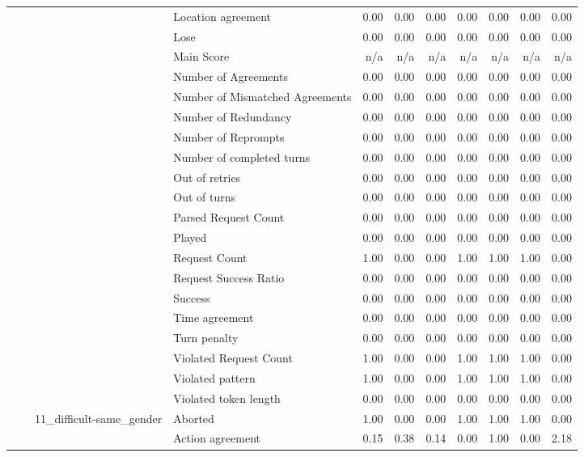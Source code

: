 \begin{tabular}{llllrrrrrrr}
 &  &  & Location agreement & 0.00 & 0.00 & 0.00 & 0.00 & 0.00 & 0.00 & 0.00 \\
 &  &  & Lose & 0.00 & 0.00 & 0.00 & 0.00 & 0.00 & 0.00 & 0.00 \\
 &  &  & Main Score & n/a & n/a & n/a & n/a & n/a & n/a & n/a \\
 &  &  & Number of Agreements & 0.00 & 0.00 & 0.00 & 0.00 & 0.00 & 0.00 & 0.00 \\
 &  &  & Number of Mismatched Agreements & 0.00 & 0.00 & 0.00 & 0.00 & 0.00 & 0.00 & 0.00 \\
 &  &  & Number of Redundancy & 0.00 & 0.00 & 0.00 & 0.00 & 0.00 & 0.00 & 0.00 \\
 &  &  & Number of Reprompts & 0.00 & 0.00 & 0.00 & 0.00 & 0.00 & 0.00 & 0.00 \\
 &  &  & Number of completed turns & 0.00 & 0.00 & 0.00 & 0.00 & 0.00 & 0.00 & 0.00 \\
 &  &  & Out of retries & 0.00 & 0.00 & 0.00 & 0.00 & 0.00 & 0.00 & 0.00 \\
 &  &  & Out of turns & 0.00 & 0.00 & 0.00 & 0.00 & 0.00 & 0.00 & 0.00 \\
 &  &  & Parsed Request Count & 0.00 & 0.00 & 0.00 & 0.00 & 0.00 & 0.00 & 0.00 \\
 &  &  & Played & 0.00 & 0.00 & 0.00 & 0.00 & 0.00 & 0.00 & 0.00 \\
 &  &  & Request Count & 1.00 & 0.00 & 0.00 & 1.00 & 1.00 & 1.00 & 0.00 \\
 &  &  & Request Success Ratio & 0.00 & 0.00 & 0.00 & 0.00 & 0.00 & 0.00 & 0.00 \\
 &  &  & Success & 0.00 & 0.00 & 0.00 & 0.00 & 0.00 & 0.00 & 0.00 \\
 &  &  & Time agreement & 0.00 & 0.00 & 0.00 & 0.00 & 0.00 & 0.00 & 0.00 \\
 &  &  & Turn penalty & 0.00 & 0.00 & 0.00 & 0.00 & 0.00 & 0.00 & 0.00 \\
 &  &  & Violated Request Count & 1.00 & 0.00 & 0.00 & 1.00 & 1.00 & 1.00 & 0.00 \\
 &  &  & Violated pattern & 1.00 & 0.00 & 0.00 & 1.00 & 1.00 & 1.00 & 0.00 \\
 &  &  & Violated token length & 0.00 & 0.00 & 0.00 & 0.00 & 0.00 & 0.00 & 0.00 \\
\cline{3-11}
 &  & \multirow[t]{27}{*}{11_difficult-same_gender} & Aborted & 1.00 & 0.00 & 0.00 & 1.00 & 1.00 & 1.00 & 0.00 \\
 &  &  & Action agreement & 0.15 & 0.38 & 0.14 & 0.00 & 1.00 & 0.00 & 2.18 \\

\end{tabular}
